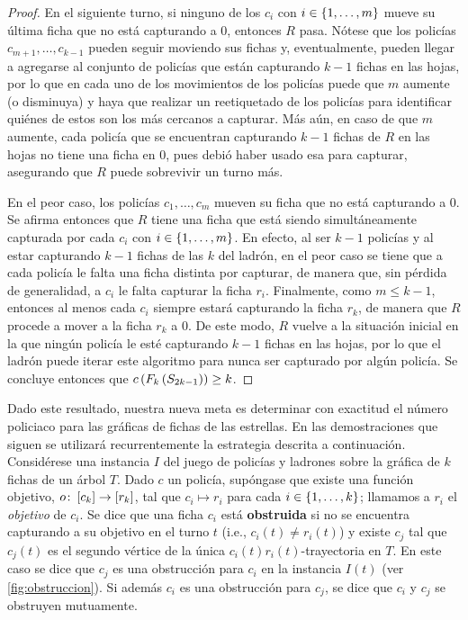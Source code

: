 \begin{proof}
    En el siguiente turno, si ninguno de los $c_{i}$ con $i\in\{1,\dots, m\}$ mueve
    su \'ultima ficha que no est\'a capturando a $0$, entonces $R$ pasa.
    N\'otese que los polic\'ias $c_{m+1},\dots,c_{{k-1}}$ pueden seguir moviendo
    sus fichas y, eventualmente, pueden llegar a agregarse al conjunto de
    polic\'ias que est\'an capturando $k-1$ fichas en las hojas, por lo que en
    cada uno de los movimientos de los polic\'ias puede que $m$ aumente (o
    disminuya) y haya que realizar un reetiquetado de los polic\'ias para
    identificar qui\'enes de estos son los m\'as cercanos a capturar. M\'as
    a\'un, en caso de que $m$ aumente, cada polic\'ia que se encuentran
    capturando $k-1$ fichas de $R$ en las hojas no tiene una ficha en $0$, pues
    debi\'o haber usado esa para capturar, asegurando que $R$ puede sobrevivir
    un turno m\'as.

    En el peor caso, los polic\'ias $c_1,\dots, c_m$ mueven su ficha que no
    est\'a capturando a $0$. Se afirma entonces que $R$ tiene una ficha que
    est\'a siendo simult\'aneamente capturada por cada $c_{i}$ con $i\in
    \{1,\dots, m\}$. En efecto, al ser $k-1$ polic\'ias y al estar capturando $k-1$
    fichas de las $k$ del ladr\'on, en el peor caso se tiene que a cada
    polic\'ia le falta una ficha distinta por capturar, de manera que, sin
    p\'erdida de generalidad, a $c_{i}$ le falta capturar la ficha $r_i$.
    Finalmente, como $m\leq k-1$, entonces al menos cada $c_{i}$ siempre
    estar\'a capturando la ficha $r_k$, de manera que $R$ procede a mover a la
    ficha $r_k$ a $0$. De este modo, $R$ vuelve a la situaci\'on inicial en la
    que ning\'un polic\'ia le est\'e capturando $k-1$ fichas en las hojas, por
    lo que el ladr\'on puede iterar este algoritmo para nunca ser capturado por
    alg\'un polic\'ia. Se concluye entonces que $c\left( F_{k}\left( S_{2k-1}\right)\right) \ge
    k$.   
\end{proof}

Dado este resultado, nuestra nueva meta es determinar con exactitud el n\'umero
policiaco para las gr\'aficas de fichas de las estrellas. En las demostraciones
que siguen se utilizar\'a recurrentemente la estrategia descrita a
continuaci\'on. Consid\'erese una instancia $I$ del juego de polic\'ias y
ladrones sobre la gr\'afica de $k$ fichas de un \'arbol $T$. Dado $c$ un
polic\'ia, sup\'ongase que existe una funci\'on objetivo, $o \colon \left[ c_k\right]\to
\left[ r_k\right]$, tal que $c_i\mapsto r_i$ para cada $i\in\{1,\dots, k\}$; llamamos a $r_i$
el \textit{objetivo} de $c_i$. Se dice que una ficha $c_i$ est\'a
\textbf{obstruida} si no se encuentra capturando a su objetivo en el turno $t$
(i.e., $c_i(t)\neq r_i(t)$) y existe $c_j$ tal que $c_j(t)$ es el segundo
v\'ertice de la \'unica $c_i(t)r_i(t)$-trayectoria en $T$. En este caso se dice
que $c_j$ es una obstrucci\'on para $c_i$ en la instancia $I(t)$ (ver
\cref{fig:obstruccion}). Si adem\'as $c_i$ es una obstrucci\'on para $c_j$, se
dice que $c_i$ y $c_j$ se obstruyen mutuamente.

